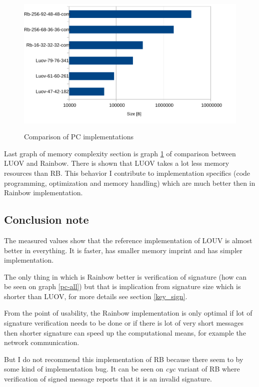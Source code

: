 \documentclass[thesis=M,english]{FITthesis}[2019/12/23]
\begin{document}
\begin{figure}[H]
\centering
\includegraphics[width=13cm,height=7cm]{images/mem-pc-all.pdf}
\caption{Comparison of PC implementations}
\label{mem-pc-all}
\end{figure}

\noindent
Last graph of memory complexity section is graph \ref{mem-pc-all} of comparison between LUOV and Rainbow. There is shown that LUOV takes a lot less memory resources than RB.  This behavior I contribute to implementation specifics (code programming, optimization and memory handling) which are much better then in Rainbow implementation.

\subsection{Conclusion note}
The measured values show that the reference implementation of LOUV is almost better in everything. It is faster, has smaller memory imprint and has simpler implementation.

\bigskip
\noindent
The only thing in which is Rainbow better is verification of signature (how can be seen on graph \ref{pc-all}) but that is implication from signature size which is shorter than LUOV, for more details see section \ref{key_sign}.

\bigskip
\noindent
From the point of usability, the Rainbow implementation is only optimal if lot of signature verification needs to be done or if there is lot of very short messages then shorter signature can speed up the computational means, for example the network communication.

\bigskip
\noindent
But I do not recommend this implementation of RB because there seem to by some kind of implementation bug. It can be seen on \textit{cyc} variant of RB where verification of signed message reports that it is an invalid signature.
\end{document}
